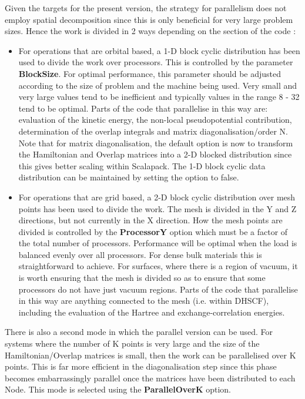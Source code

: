 Given the targets for the present version, the strategy for parallelism
does not employ spatial decomposition since this is only beneficial for
very large problem sizes. Hence the work is divided in 2 ways depending
on the section of the code :

\begin{itemize}
\item
For operations that are orbital based, a 1-D block cyclic distribution
has been used to divide the work over processors. This is controlled
by the parameter \textbf{BlockSize}.
For optimal performance, this parameter
should be adjusted according to the size of problem and the machine
being used. Very small and very large values tend to be inefficient
and typically values in the range 8 - 32 tend to be optimal. Parts of
the code that parallelise in this way are: evaluation of the kinetic
energy, the non-local pseudopotential contribution, determination of
the overlap integrals and matrix diagonalisation/order N. Note that
for matrix diagonalisation, the default option is now to transform the
Hamiltonian and Overlap matrices into a 2-D blocked distribution since
this gives better scaling within Scalapack. The 1-D block cyclic
data distribution can be maintained by setting the option 
to false.

\item
For operations that are grid based, a 2-D block cyclic distribution
over mesh points has been used to divide the work. The mesh is divided
in the Y and Z directions, but not currently in the X direction. How
the mesh points are divided is controlled by the \textbf{ProcessorY}
option which must be a factor of the total number of processors.
Performance will be optimal when the load is balanced evenly
over all processors. For dense bulk materials this is straightforward
to achieve. For surfaces, where there is a region of vacuum, it is
worth ensuring that the mesh is divided so as to ensure that some
processors do not have just vacuum regions. Parts of the code that
parallelise in this way are anything connected to the mesh (i.e. within
DHSCF), including the evaluation of the Hartree and exchange-correlation
energies.
\end{itemize}

There is also a second mode in which the parallel version can be used. For
systems where the number of K points is very large and the size of the
Hamiltonian/Overlap matrices is small, then the work can be parallelised
over K points. This is far more efficient in the diagonalisation step
since this phase becomes embarrassingly parallel once the matrices have
been distributed to each Node. This mode is selected using the
\textbf{ParallelOverK} 
option.

